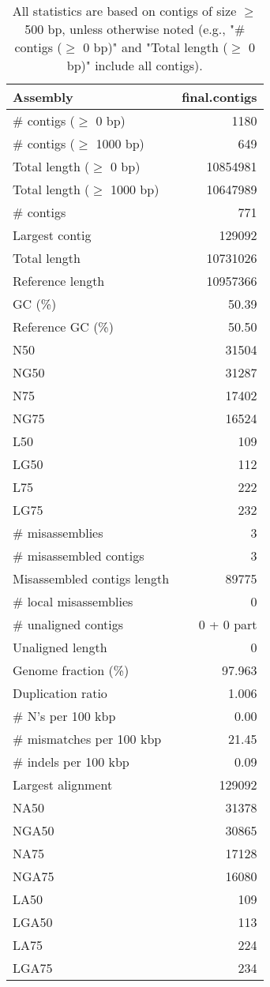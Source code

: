 \documentclass[12pt,a4paper]{article}
\begin{document}
\begin{table}[ht]
\begin{center}
\caption{All statistics are based on contigs of size $\geq$ 500 bp, unless otherwise noted (e.g., "\# contigs ($\geq$ 0 bp)" and "Total length ($\geq$ 0 bp)" include all contigs).}
\begin{tabular}{|l*{1}{|r}|}
\hline
Assembly & final.contigs \\ \hline
\# contigs ($\geq$ 0 bp) & 1180 \\ \hline
\# contigs ($\geq$ 1000 bp) & 649 \\ \hline
Total length ($\geq$ 0 bp) & 10854981 \\ \hline
Total length ($\geq$ 1000 bp) & 10647989 \\ \hline
\# contigs & 771 \\ \hline
Largest contig & 129092 \\ \hline
Total length & 10731026 \\ \hline
Reference length & 10957366 \\ \hline
GC (\%) & 50.39 \\ \hline
Reference GC (\%) & 50.50 \\ \hline
N50 & 31504 \\ \hline
NG50 & 31287 \\ \hline
N75 & 17402 \\ \hline
NG75 & 16524 \\ \hline
L50 & 109 \\ \hline
LG50 & 112 \\ \hline
L75 & 222 \\ \hline
LG75 & 232 \\ \hline
\# misassemblies & 3 \\ \hline
\# misassembled contigs & 3 \\ \hline
Misassembled contigs length & 89775 \\ \hline
\# local misassemblies & 0 \\ \hline
\# unaligned contigs & 0 + 0 part \\ \hline
Unaligned length & 0 \\ \hline
Genome fraction (\%) & 97.963 \\ \hline
Duplication ratio & 1.006 \\ \hline
\# N's per 100 kbp & 0.00 \\ \hline
\# mismatches per 100 kbp & 21.45 \\ \hline
\# indels per 100 kbp & 0.09 \\ \hline
Largest alignment & 129092 \\ \hline
NA50 & 31378 \\ \hline
NGA50 & 30865 \\ \hline
NA75 & 17128 \\ \hline
NGA75 & 16080 \\ \hline
LA50 & 109 \\ \hline
LGA50 & 113 \\ \hline
LA75 & 224 \\ \hline
LGA75 & 234 \\ \hline
\end{tabular}
\end{center}
\end{table}
\end{document}
